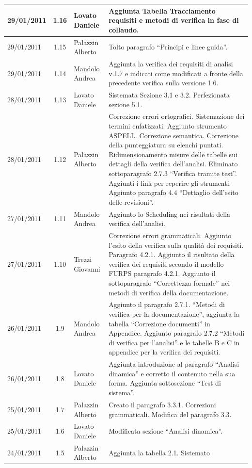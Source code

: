 \begin{longtable}{|p{}|c|p{}|p{}|}
\hline
29/01/2011 & 1.16 & Lovato Daniele & Aggiunta Tabella Tracciamento requisiti e
metodi di verifica in fase di collaudo.\\
\hline
29/01/2011 & 1.15 & Palazzin Alberto & Tolto paragrafo ``Principi e linee
guida''.\\
\hline
29/01/2011 & 1.14 & Mandolo Andrea & Aggiunta la verifica dei requisiti di
analisi v.1.7 e indicati come modificati a fronte della precedente verifica
sulla versione 1.6.\\
\hline
28/01/2011 & 1.13 & Lovato Daniele & Sistemata Sezione 3.1 e 3.2.
Perfezionata sezione 5.1.\\
\hline
28/01/2011 & 1.12 & Palazzin Alberto & Correzione errori ortografici.
Sistemazione dei termini enfatizzati. Aggiunto strumento ASPELL. Correzione
semantica. Correzione della punteggiatura su elenchi puntati.
Ridimensionamento misure delle tabelle sui dettagli della verifica
dell'analisi. Eliminato sottoparagrafo 2.7.3 ``Verifica tramite test''.
Aggiunti i link per reperire gli strumenti. Aggiunto paragrafo 4.4 ``Dettaglio
dell'esito delle revisioni''.\\
\hline
27/01/2011 & 1.11 & Mandolo Andrea & Aggiunto lo Scheduling nei risultati
della verifica dell'analisi.\\
\hline
27/01/2011 & 1.10 & Trezzi Giovanni & Correzione errori grammaticali. Aggiunto
l'esito della verifica sulla qualit\`a dei requisiti. Paragrafo 4.2.1. Aggiunto
il risultato della verifica dei requisiti secondo il modello FURPS paragrafo
4.2.1. Aggiunto il sottoparagrafo ``Correttezza formale'' nei metodi di
verifica della documentazione.\\
\hline
26/01/2011 & 1.9 & Mandolo Andrea & Aggiunto
il paragrafo 2.7.1. ``Metodi di verifica per la documentazione'', aggiunta la
tabella ``Correzione documenti'' in Appendice. Aggiunto paragrafo 2.7.2 ``Metodi
di verifica per l'analisi'' e le tabelle B e C in appendice per la verifica dei requisiti.\\
\hline
26/01/2011 & 1.8 & Lovato Daniele & Aggiunta introduzione al paragrafo
``Analisi dinamica'' e corretto il contenuto nella sua forma. Aggiunta
sottosezione ``Test di sistema''.\\
\hline
25/01/2011 & 1.7 & Palazzin Alberto & Creato il paragrafo 3.3.1. Correzioni
grammaticali. Modifica del paragrafo 3.3.\\
\hline
25/01/2011 & 1.6 & Lovato Daniele & Modificata sezione ``Analisi dinamica''.\\
\hline
24/01/2011 & 1.5 & Palazzin Alberto & Aggiunta la tabella 2.1. Sistemato

\end{longtable}
